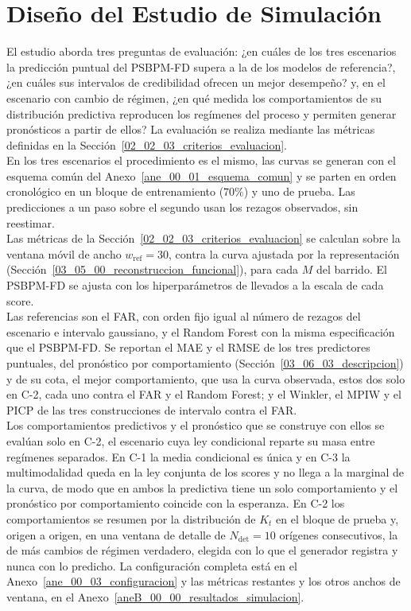 \section{Diseño del Estudio de Simulación}
\label{03_07_00_diseno_estudio_simulacion}

El estudio aborda tres preguntas de evaluación: ¿en cuáles de los tres escenarios la predicción puntual del PSBPM-FD supera a la de los modelos de referencia?, ¿en cuáles sus intervalos de credibilidad ofrecen un mejor desempeño? y, en el escenario con cambio de régimen, ¿en qué medida los comportamientos de su distribución predictiva reproducen los regímenes del proceso y permiten generar pronósticos a partir de ellos? La evaluación se realiza mediante las métricas definidas en la Sección~\ref{02_02_03_criterios_evaluacion}.\\

En los tres escenarios el procedimiento es el mismo, las curvas se generan con el esquema común del Anexo~\ref{ane_00_01_esquema_comun} y se parten en orden cronológico en un bloque de entrenamiento ($70\%$) y uno de prueba. Las predicciones a un paso sobre el segundo usan los rezagos observados, sin reestimar.\\

Las métricas de la Sección~\ref{02_02_03_criterios_evaluacion} se calculan sobre la ventana móvil de ancho $w_{\mathrm{ref}} = 30$, contra la curva ajustada por la representación (Sección~\ref{03_05_00_reconstruccion_funcional}), para cada $M$ del barrido. El PSBPM-FD se ajusta con los hiperparámetros de \citet{03_02_chung2009nonparametric} llevados a la escala de cada score.\\

Las referencias son el FAR, con orden fijo igual al número de rezagos del escenario e intervalo gaussiano, y el Random Forest con la misma especificación que el PSBPM-FD. Se reportan el MAE y el RMSE de los tres predictores puntuales, del pronóstico por comportamiento (Sección~\ref{03_06_03_descripcion}) y de su cota, el mejor comportamiento, que usa la curva observada, estos dos solo en C-2, cada uno contra el FAR y el Random Forest; y el Winkler, el MPIW y el PICP de las tres construcciones de intervalo contra el FAR.\\

Los comportamientos predictivos y el pronóstico que se construye con ellos se evalúan solo en C-2, el escenario cuya ley condicional reparte su masa entre regímenes separados. En C-1 la media condicional es única y en C-3 la multimodalidad queda en la ley conjunta de los scores y no llega a la marginal de la curva, de modo que en ambos la predictiva tiene un solo comportamiento y el pronóstico por comportamiento coincide con la esperanza. En C-2 los comportamientos se resumen por la distribución de $K_t$ en el bloque de prueba y, origen a origen, en una ventana de detalle de $N_{\mathrm{det}} = 10$ orígenes consecutivos, la de más cambios de régimen verdadero, elegida con lo que el generador registra y nunca con lo predicho.  La configuración completa está en el Anexo~\ref{ane_00_03_configuracion} y las métricas restantes y los otros anchos de ventana, en el Anexo~\ref{aneB_00_00_resultados_simulacion}.

